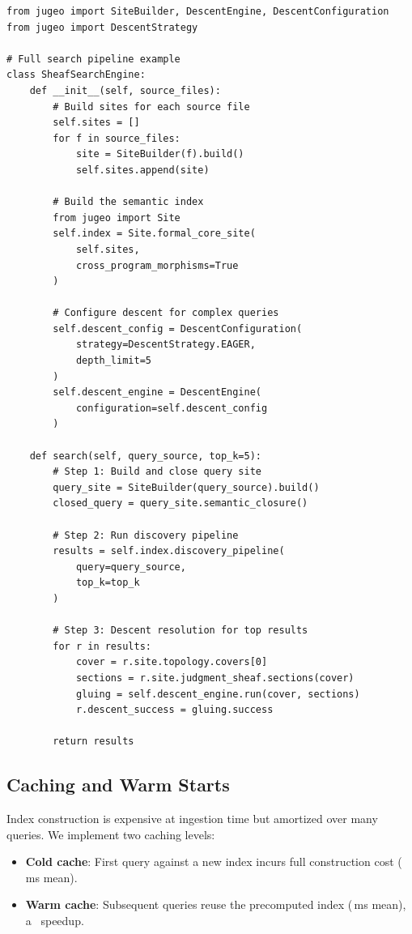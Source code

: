 \documentclass[11pt]{article}
\begin{document}
\begin{lstlisting}[style=jugeo-python]
from jugeo import SiteBuilder, DescentEngine, DescentConfiguration
from jugeo import DescentStrategy

# Full search pipeline example
class SheafSearchEngine:
    def __init__(self, source_files):
        # Build sites for each source file
        self.sites = []
        for f in source_files:
            site = SiteBuilder(f).build()
            self.sites.append(site)

        # Build the semantic index
        from jugeo import Site
        self.index = Site.formal_core_site(
            self.sites,
            cross_program_morphisms=True
        )

        # Configure descent for complex queries
        self.descent_config = DescentConfiguration(
            strategy=DescentStrategy.EAGER,
            depth_limit=5
        )
        self.descent_engine = DescentEngine(
            configuration=self.descent_config
        )

    def search(self, query_source, top_k=5):
        # Step 1: Build and close query site
        query_site = SiteBuilder(query_source).build()
        closed_query = query_site.semantic_closure()

        # Step 2: Run discovery pipeline
        results = self.index.discovery_pipeline(
            query=query_source,
            top_k=top_k
        )

        # Step 3: Descent resolution for top results
        for r in results:
            cover = r.site.topology.covers[0]
            sections = r.site.judgment_sheaf.sections(cover)
            gluing = self.descent_engine.run(cover, sections)
            r.descent_success = gluing.success

        return results
\end{lstlisting}

\subsection{Caching and Warm Starts}

Index construction is expensive at ingestion time but amortized over
many queries.  We implement two caching levels:

\begin{itemize}[noitemsep]
  \item \textbf{Cold cache}: First query against a new index incurs
        full construction cost (\suppColdMeanMs\,ms mean).
  \item \textbf{Warm cache}: Subsequent queries reuse the precomputed
        index (\suppWarmMeanMs\,ms mean), a \suppCacheSpeedup\ speedup.
\end{itemize}
\end{document}
